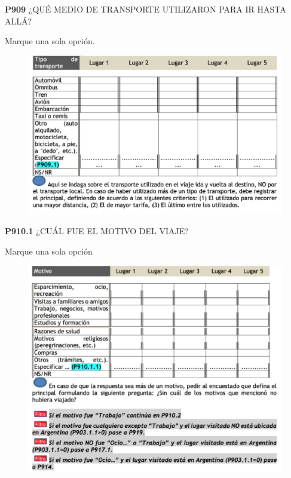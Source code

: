 \documentclass[
  openany]{book}
\begin{document}
\textbf{P909} ¿QUÉ MEDIO DE TRANSPORTE UTILIZARON PARA IR HASTA ALLÁ?

Marque una sola opción.

\begin{figure}

{\centering \includegraphics[width=1\linewidth]{imagenes/figura6-288} 

}

\end{figure}

\textbf{P910.1} ¿CUÁL FUE EL MOTIVO DEL VIAJE?

Marque una sola opción

\begin{figure}

{\centering \includegraphics[width=1\linewidth]{imagenes/figura6-289} 

}

\end{figure}
\end{document}
